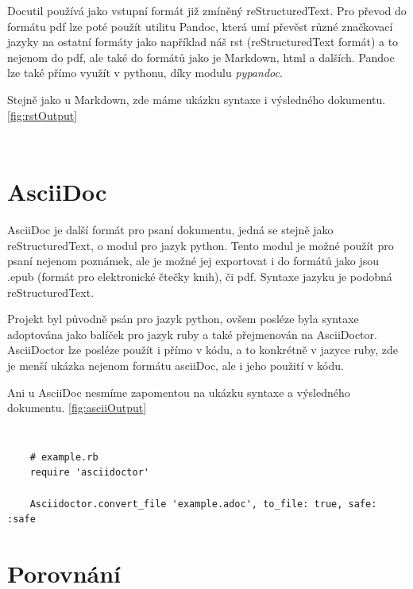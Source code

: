  \cite{docutil}
Docutil používá jako vstupní formát již zmíněný reStructuredText. Pro převod do formátu \gls{pdf} lze poté použít utilitu Pandoc, která umí převěst různé značkovací jazyky
na ostatní formáty jako například náš rst (reStructuredText formát) a to nejenom do \gls{pdf}, ale také do formátů jako je Markdown, \gls{html} a dalších.
Pandoc lze také přímo využít v pythonu, díky modulu \textit{pypandoc}.

Stejně jako u Markdown, zde máme ukázku syntaxe i výsledného dokumentu. \ref{fig:rstOutput}

\inputminted[linenos,breaklines]{rst}{example-rst.rst}
\inputminted[linenos,breaklines]{rst}{module.rst}

\clearpage

\section{AsciiDoc}

AsciiDoc je další formát pro psaní dokumentu, jedná se stejně jako reStructuredText, o modul pro jazyk python. Tento modul je možné použít pro psaní nejenom poznámek,
ale je možné jej exportovat i do formátů jako jsou .epub (formát pro elektronické čtečky knih), či \gls{pdf}. \cite{asciiDoc} Syntaxe jazyku je podobná reStructuredText.

Projekt byl původně psán pro jazyk python, ovšem posléze byla syntaxe adoptována jako balíček pro jazyk ruby a také přejmenován na AsciiDoctor. AsciiDoctor lze posléze
použít i přímo v kódu, a to konkrétně v jazyce ruby, zde je menší ukázka nejenom formátu asciiDoc, ale i jeho použití v kódu.

Ani u AsciiDoc nesmíme zapomentou na ukázku syntaxe a výsledného dokumentu. \ref{fig:asciiOutput}

\inputminted[linenos,breaklines]{text}{example-ascii.adoc}
\inputminted[linenos,breaklines]{text}{module.adoc}
\begin{verbatim}
    # example.rb
    require 'asciidoctor'

    Asciidoctor.convert_file 'example.adoc', to_file: true, safe: :safe
\end{verbatim}

\clearpage

\section{Porovnání}

